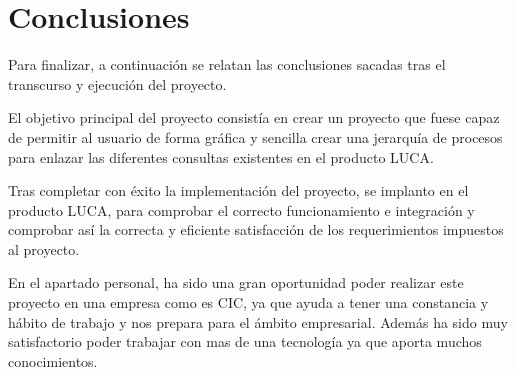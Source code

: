 	\chapter{Conclusiones}
	
	Para finalizar, a continuación se relatan las conclusiones sacadas tras el transcurso y ejecución del proyecto.
	
	
	El objetivo principal del proyecto consistía en crear un proyecto que fuese capaz de permitir al usuario de forma gráfica y sencilla crear una jerarquía de procesos para enlazar las diferentes consultas existentes en el producto LUCA. 
	
	
	Tras completar con éxito la implementación del proyecto, se implanto en el producto LUCA, para comprobar el correcto funcionamiento e integración y comprobar así la correcta y eficiente satisfacción de los requerimientos impuestos al proyecto.
	
	
	En el apartado personal, ha sido una gran oportunidad poder realizar este proyecto en una empresa como es CIC, ya que ayuda a tener una constancia y hábito de trabajo y nos prepara para el ámbito empresarial. Además ha sido muy satisfactorio poder trabajar con mas de una tecnología ya que aporta muchos conocimientos.


	